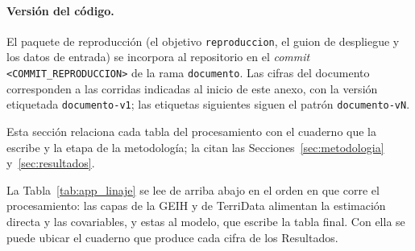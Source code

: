 \paragraph{Versión del código.} El paquete de reproducción (el objetivo \texttt{reproduccion}, el guion de despliegue y los datos de entrada) se incorpora al repositorio en el \textit{commit} \texttt{<COMMIT\_REPRODUCCION>} de la rama \texttt{documento}. Las cifras del documento corresponden a las corridas indicadas al inicio de este anexo, con la versión etiquetada \texttt{documento-v1}; las etiquetas siguientes siguen el patrón \texttt{documento-vN}.

\label{app:linaje}

Esta sección relaciona cada tabla del procesamiento con el cuaderno que la escribe y la etapa de la metodología; la citan las Secciones~\ref{sec:metodologia} y~\ref{sec:resultados}.

La Tabla~\ref{tab:app_linaje} se lee de arriba abajo en el orden en que corre el procesamiento: las capas de la GEIH y de TerriData alimentan la estimación directa y las covariables, y estas al modelo, que escribe la tabla final. Con ella se puede ubicar el cuaderno que produce cada cifra de los Resultados.

